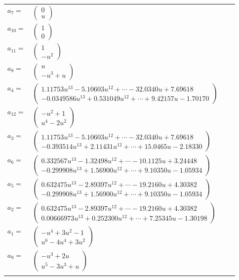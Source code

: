 \documentclass[1p]{elsarticle_modified}
\theoremstyle{definition}
\begin{document}
\begin{tabular}{m{7pt} m{180pt} m{7pt} m{180pt} }
\flushright $a_{7}=$&$\begin{pmatrix}0\\u\end{pmatrix}$ \\
\flushright $a_{10}=$&$\begin{pmatrix}1\\0\end{pmatrix}$ \\
\flushright $a_{11}=$&$\begin{pmatrix}1\\- u^2\end{pmatrix}$ \\
\flushright $a_{8}=$&$\begin{pmatrix}u\\- u^3+u\end{pmatrix}$ \\
\flushright $a_{4}=$&$\begin{pmatrix}1.11753 u^{13}-5.10603 u^{12}+\cdots-32.0340 u+7.69618\\-0.0349586 u^{13}+0.531049 u^{12}+\cdots+9.42157 u-1.70170\end{pmatrix}$ \\
\flushright $a_{12}=$&$\begin{pmatrix}- u^2+1\\u^4-2 u^2\end{pmatrix}$ \\
\flushright $a_{3}=$&$\begin{pmatrix}1.11753 u^{13}-5.10603 u^{12}+\cdots-32.0340 u+7.69618\\-0.393514 u^{13}+2.11431 u^{12}+\cdots+15.0465 u-2.18330\end{pmatrix}$ \\
\flushright $a_{6}=$&$\begin{pmatrix}0.332567 u^{13}-1.32498 u^{12}+\cdots-10.1125 u+3.24448\\-0.299908 u^{13}+1.56900 u^{12}+\cdots+9.10350 u-1.05934\end{pmatrix}$ \\
\flushright $a_{5}=$&$\begin{pmatrix}0.632475 u^{13}-2.89397 u^{12}+\cdots-19.2160 u+4.30382\\-0.299908 u^{13}+1.56900 u^{12}+\cdots+9.10350 u-1.05934\end{pmatrix}$ \\
\flushright $a_{2}=$&$\begin{pmatrix}0.632475 u^{13}-2.89397 u^{12}+\cdots-19.2160 u+4.30382\\0.00666973 u^{13}+0.252300 u^{12}+\cdots+7.25345 u-1.30198\end{pmatrix}$ \\
\flushright $a_{1}=$&$\begin{pmatrix}- u^4+3 u^2-1\\u^6-4 u^4+3 u^2\end{pmatrix}$ \\
\flushright $a_{9}=$&$\begin{pmatrix}- u^3+2 u\\u^5-3 u^3+u\end{pmatrix}$\\&\end{tabular}
\end{document}
